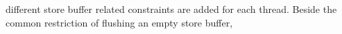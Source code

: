 \noindent
%
different store buffer related constraints are added for each thread.
Beside the common restriction of flushing an empty store buffer, %
